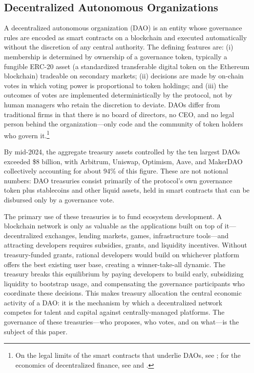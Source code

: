 \documentclass[12pt]{article}
\begin{document}
\subsection{Decentralized Autonomous Organizations}

A decentralized autonomous organization (DAO) is an entity whose governance rules
are encoded as smart contracts on a blockchain and executed automatically without
the discretion of any central authority. The defining features are: (i) membership
is determined by ownership of a governance token, typically a fungible ERC-20 asset
(a standardized transferable digital token on the Ethereum blockchain)
tradeable on secondary markets; (ii) decisions are made by on-chain votes in which
voting power is proportional to token holdings; and (iii) the outcomes of votes are
implemented deterministically by the protocol, not by human managers who retain the
discretion to deviate. DAOs differ from traditional firms in that there is no board
of directors, no CEO, and no legal person behind the organization---only code and
the community of token holders who govern it.\footnote{On the legal limits of the smart contracts that underlie DAOs, see \citet{frankenreiter2019}; for the economics of decentralized finance, see \citet{harvey2021} and \citet{jensen2021}.}

By mid-2024, the aggregate treasury assets controlled by the ten largest DAOs
exceeded \$8 billion, with Arbitrum, Uniswap, Optimism, Aave, and MakerDAO
collectively accounting for about 94\% of this figure. These are not notional
numbers: DAO treasuries consist primarily of the protocol's own governance token
plus stablecoins and other liquid assets, held in smart contracts that can be
disbursed only by a governance vote.

The primary use of these treasuries is to fund ecosystem development. A blockchain
network is only as valuable as the applications built on top of it---decentralized
exchanges, lending markets, games, infrastructure tools---and attracting developers
requires subsidies, grants, and liquidity incentives. Without treasury-funded grants,
rational developers would build on whichever platform offers the best existing
user base, creating a winner-take-all dynamic. The treasury breaks this equilibrium
by paying developers to build early, subsidizing liquidity to bootstrap usage, and
compensating the governance participants who coordinate these decisions.
This makes treasury allocation the central economic activity of a DAO: it is the
mechanism by which a decentralized network competes for talent and capital
against centrally-managed platforms. The governance of these treasuries---who
proposes, who votes, and on what---is the subject of this paper.
\end{document}
